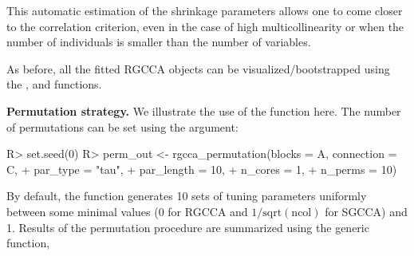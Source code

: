 \documentclass[
]{jss}
\begin{document}
\normalsize

This automatic estimation of the shrinkage parameters allows one to come
closer to the correlation criterion, even in the case of high
multicollinearity or when the number of individuals is smaller than the
number of variables.

As before, all the fitted RGCCA objects can be visualized/bootstrapped
using the ,  and 
functions.

\textbf{Permutation strategy.} We illustrate the use of the
 function here. The number of permutations
can be set using the  argument:

\footnotesize

\begin{CodeChunk}
\begin{CodeInput}
R> set.seed(0)
R> perm_out <- rgcca_permutation(blocks = A, connection = C,
+                               par_type = "tau",
+                               par_length = 10,
+                               n_cores = 1,
+                               n_perms = 10)
\end{CodeInput}
\end{CodeChunk}

\normalsize

By default, the  function generates 10 sets of
tuning parameters uniformly between some minimal values (0 for RGCCA and
\(1/\text{sqrt}(\text{ncol})\) for SGCCA) and 1. Results of the
permutation procedure are summarized using the generic 
function,

\footnotesize
\end{document}
